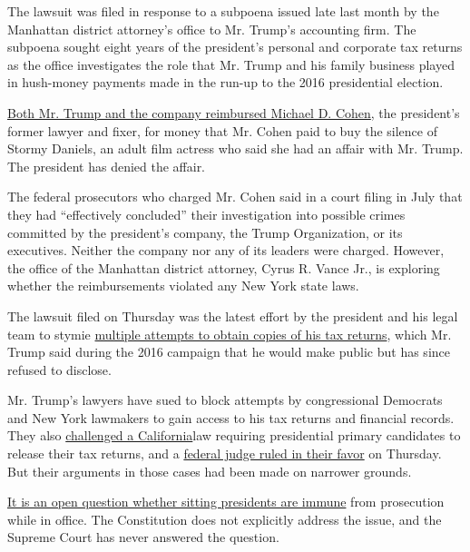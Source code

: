 The lawsuit was filed in response to a subpoena issued late last month
by the Manhattan district attorney's office to Mr. Trump's accounting
firm. The subpoena sought eight years of the president's personal and
corporate tax returns as the office investigates the role that Mr. Trump
and his family business played in hush-money payments made in the run-up
to the 2016 presidential election.

\href{https://www.nytimes3xbfgragh.onion/2018/08/21/nyregion/michael-cohen-plea-deal-trump.html}{Both
Mr. Trump and the company reimbursed Michael D. Cohen}, the president's
former lawyer and fixer, for money that Mr. Cohen paid to buy the
silence of Stormy Daniels, an adult film actress who said she had an
affair with Mr. Trump. The president has denied the affair.

The federal prosecutors who charged Mr. Cohen said in a court filing in
July that they had ``effectively concluded'' their investigation into
possible crimes committed by the president's company, the Trump
Organization, or its executives. Neither the company nor any of its
leaders were charged. However, the office of the Manhattan district
attorney, Cyrus R. Vance Jr., is exploring whether the reimbursements
violated any New York state laws.

The lawsuit filed on Thursday was the latest effort by the president and
his legal team to stymie
\href{https://www.nytimes3xbfgragh.onion/2019/08/13/us/politics/trump-house-lawsuits.html?module=inline}{multiple
attempts to obtain copies of his tax returns}, which Mr. Trump said
during the 2016 campaign that he would make public but has since refused
to disclose.

Mr. Trump's lawyers have sued to block attempts by congressional
Democrats and New York lawmakers to gain access to his tax returns and
financial records. They also
\href{https://www.nytimes3xbfgragh.onion/2019/08/06/us/politics/california-trump-tax-returns.html?module=inline}{challenged
a California}law requiring presidential primary candidates to release
their tax returns, and a
\href{https://www.latimes.com/california/story/2019-09-19/trump-tax-returns-federal-court-challenge-california}{federal
judge ruled in their favor} on Thursday. But their arguments in those
cases had been made on narrower grounds.

\href{https://www.nytimes3xbfgragh.onion/2017/05/29/us/politics/a-constitutional-puzzle-can-the-president-be-indicted.html?module=inline}{It
is an open question whether sitting presidents are immune} from
prosecution while in office. The Constitution does not explicitly
address the issue, and the Supreme Court has never answered the
question.

